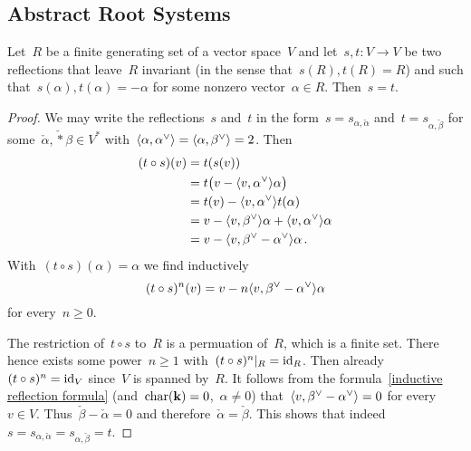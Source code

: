 \subsection{Abstract Root Systems}


\begin{lemma}
  \label{uniqueness of reflections}
  Let~$R$ be a finite generating set of a vector space~$V$ and let~$s, t \colon V \to V$ be two reflections that leave~$R$ invariant (in the sense that~$s(R), t(R) = R$) and such that~$s(\alpha), t(\alpha) = -\alpha$ for some nonzero vector~$\alpha \in R$.
  Then~$s = t$.
\end{lemma}


\begin{proof}
  We may write the reflections~$s$ and~$t$ in the form~$s = s_{\alpha, \check{\alpha}}$ and~$t = s_{\alpha, \check{\beta}}$ for some~$\check{\alpha}, \check*{\beta} \in V^*$ with~$\pair{\alpha, \check{\alpha}} = \pair{\alpha, \check{\beta}} = 2$.
  Then
  \begin{align*}
    (t \circ s)(v)
    &=
    t(s(v))
    \\
    &=
    t\bigl( v - \pair{v, \check{\alpha}} \alpha \bigr)
    \\
    &=
    t(v) - \pair{v, \check{\alpha}} t(\alpha)
    \\
    &=
    v - \pair{v, \check{\beta}} \alpha + \pair{v, \check{\alpha}} \alpha
    \\
    &=
    v - \pair{v, \check{\beta} - \check{\alpha}} \alpha \,.
  \end{align*}
  With~$(t \circ s)(\alpha) = \alpha$ we find inductively
  \begin{equation}
    \label{inductive reflection formula}
    (t \circ s)^n(v)
    =
    v - n \pair{v, \check{\beta} - \check{\alpha}} \alpha
  \end{equation}
  for every~$n \geq 0$.
  
  The restriction of~$t \circ s$ to~$R$ is a permuation of~$R$, which is a finite set.
  There hence exists some power~$n \geq 1$ with~$\restrict{(t \circ s)^n}{R} = \id_{R}$.
  Then already~$(t \circ s)^n = \operatorname{id}_V$ since~$V$ is spanned by~$R$.
  It follows from the formula~\eqref{inductive reflection formula} (and~$\operatorname{char}(\mathbf{k}) = 0$,~$\alpha \neq 0$) that~$\pair{v, \check{\beta} - \check{\alpha}} = 0$ for every~$v \in V$.
  Thus~$\check{\beta} - \check{\alpha} = 0$ and therefore~$\check{\alpha} = \check{\beta}$.
  This shows that indeed~$s = s_{\alpha, \check{\alpha}} = s_{\alpha, \check{\beta}} = t$.
\end{proof}


